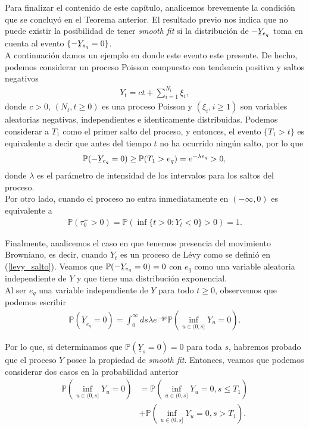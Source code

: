 Para finalizar el contenido de este capítulo, analicemos brevemente la condición que se concluyó en el Teorema anterior. El resultado previo nos indica que no puede existir la posibilidad de tener \textit{smooth fit} si la distribución de $-\ubar{Y}_{e_q}$ toma en cuenta al evento $\{ -\ubar{Y}_{e_q} = 0 \}$. \\

A continuación damos un ejemplo en donde este evento este presente. De hecho, podemos considerar un proceso Poisson compuesto con tendencia positiva y saltos negativos
\begin{align*}
Y_t = ct + \sum_{i=1}^{N_t} \xi_i,
\end{align*}
donde $c > 0$, $(N_t, t \geq 0)$ es una proceso Poisson y $(\xi_i, i \geq 1)$ son variables aleatorias negativas, independientes e identicamente distribuidas. Podemos considerar a $T_1$ como el primer salto del proceso, y entonces, el evento $\{ T_1 > t \}$ es equivalente a decir que antes del tiempo $t$ no ha ocurrido ningún salto, por lo que
\begin{align*}
\mathbb{P} (-\ubar{Y}_{e_q} = 0) \geq \mathbb{P} (T_1 > e_q) = e^{-\lambda e_q} > 0,
\end{align*}
donde $\lambda$ es el parámetro de intensidad de los intervalos para los saltos del proceso. \\

Por otro lado, cuando el proceso no entra inmediatamente en $(- \infty, 0)$ es equivalente a
\begin{align*}
\mathbb{P} (\tau^{-}_{0} > 0) = \mathbb{P} (\inf \{ t > 0 : Y_t < 0 \} > 0) = 1.
\end{align*}

Finalmente, analicemos el caso en que tenemos presencia del movimiento Browniano, es decir, cuando $Y_t$ es un proceso de Lévy como se definió en (\ref{levy_salto}). Veamos que $\mathbb{P}( - \ubar{Y}_{e_q} = 0) = 0$ con $e_q$ como una variable aleatoria independiente de $Y$ y que tiene una distribución exponencial. \\

Al ser $e_q$ una variable independiente de $Y$ para todo $t \geq 0$, observemos que podemos escribir 
\begin{align*}
	\mathbb{P} \left( \underline{Y}_{e_q} = 0 \right) = \int_0^{\infty} ds \lambda e^{- q s} \mathbb{P} \left( \inf_{u \in (0, s]} Y_u = 0 \right).
\end{align*}

Por lo que, si determinamos que $\mathbb{P}( \underline{Y}_s = 0) = 0$ para toda $s$, habremos probado que el proceso $Y$ posee la propiedad de \textit{smooth fit}. Entonces, veamos que podemos considerar dos casos en la probabilidad anterior
\begin{align}
	\mathbb{P} \left(\inf_{u \in (0, s]} Y_u = 0\right) & = \mathbb{P}\left( \inf_{u \in (0, s]} Y_u = 0, s \leq T_1 \right) \nonumber \\
    & + \mathbb{P}\left( \inf_{u \in (0, s]} Y_u = 0, s > T_1 \right). \label{correcJCsmooth}
\end{align}

